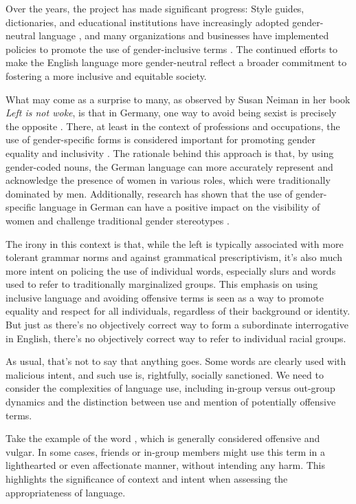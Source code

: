 Over the years, the project has made significant progress: Style guides, dictionaries, and educational institutions have increasingly adopted gender-neutral language \citep{baron1986}, and many organizations and businesses have implemented policies to promote the use of gender-inclusive terms \citep{maggio1998}. The continued efforts to make the English language more gender-neutral reflect a broader commitment to fostering a more inclusive and equitable society.

What may come as a surprise to many, as observed by Susan Neiman in her book \textit{Left is not woke}, is that in Germany, one way to avoid being sexist is precisely the opposite \citep{neiman2023}. There, at least in the context of professions and occupations, the use of gender-specific forms is considered important for promoting gender equality and inclusivity \citep{diewald2018}. The rationale behind this approach is that, by using gender-coded nouns, the German language can more accurately represent and acknowledge the presence of women in various roles, which were traditionally dominated by men. Additionally, research has shown that the use of gender-specific language in German can have a positive impact on the visibility of women and challenge traditional gender stereotypes \citep{Vervecken2012}.

The irony in this context is that, while the left is typically associated with more tolerant grammar norms and against grammatical prescriptivism, it's also much more intent on policing the use of individual words, especially slurs and words used to refer to traditionally marginalized groups. This emphasis on using inclusive language and avoiding offensive terms is seen as a way to promote equality and respect for all individuals, regardless of their background or identity. But just as there's no objectively correct way to form a subordinate interrogative in English, there's no objectively correct way to refer to individual racial groups.

As usual, that's not to say that anything goes. Some words are clearly used with malicious intent, and such use is, rightfully, socially sanctioned. We need to consider the complexities of language use, including in-group versus out-group dynamics and the distinction between use and mention of potentially offensive terms.

Take the example of the word , which is generally considered offensive and vulgar. In some cases, friends or in-group members might use this term in a lighthearted or even affectionate manner, without intending any harm. This highlights the significance of context and intent when assessing the appropriateness of language.

